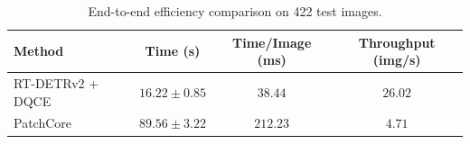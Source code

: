 \begin{table}[t]
\centering
\caption{End-to-end efficiency comparison on 422 test images.}
\label{tab:efficiency}
\begin{tabular}{lccc}
\hline
Method & Time (s) & Time/Image (ms) & Throughput (img/s) \\
\hline
RT-DETRv2 + DQCE & $16.22\pm0.85$ & $38.44$ & $26.02$ \\
PatchCore & $89.56\pm3.22$ & $212.23$ & $4.71$ \\
\hline
\end{tabular}
\end{table}
